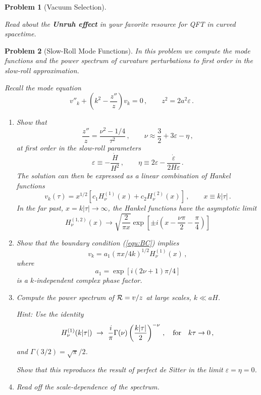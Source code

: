 \documentclass[12pt,letterpaper,rotate]{article}
\def\beq{\begin{equation}}
\def\eeq{\end{equation}}
\def\R{{\cal R}}
\newtheorem{thmP}{Problem}
\begin{document}
{\vskip 10pt
\begin{thmP}[Vacuum Selection]\label{ex:vacuum}

Read about the {\bf Unruh effect} in your favorite resource for QFT in curved spacetime.
 \end{thmP}
 
 
\begin{thmP}[Slow-Roll Mode Functions]\label{ex:SRmode}
In this problem we compute the mode functions and the power spectrum of curvature perturbations to first order in the slow-roll approximation.

\vskip 6pt
Recall the mode equation
\beq
v''_k + \left(k^2 - \frac{z''}{z} \right) v_k = 0\, , \qquad z^2 = 2 a^2 \varepsilon\, .
\eeq

\begin{enumerate}
\item Show that
\beq
\frac{z''}{z} = \frac{ \nu^2 - 1/4}{\tau^2}\, , \qquad \nu \approx \frac{3}{2} + 3 \varepsilon - \eta\, , 
\eeq
 at first order in the slow-roll parameters
 \beq
\varepsilon \equiv - \frac{\dot H}{H^2}\, , \qquad \eta \equiv 2\varepsilon - \frac{\dot \varepsilon}{2 H \varepsilon}\, .
\eeq
The solution can then be expressed as a linear combination of Hankel functions
\beq
v_k(\tau) = x^{1/2} \left[ c_1 H^{(1)}_\nu(x) + c_2 H^{(2)}_\nu(x)\right]\, , \qquad x \equiv k |\tau|\, .
\eeq
In the far past, $x = k|\tau| \to \infty$, the Hankel functions have the asymptotic limit
\beq
H_\nu^{(1,2)}(x) \to \sqrt{\frac{2}{\pi x}} \exp \left[ \pm i \left( x - \frac{\nu \pi}{2} - \frac{\pi}{4}\right)\right]
\eeq
\item Show that the boundary condition (\ref{equ:BC}) implies
\beq
v_k = a_1 (\pi x/4k)^{1/2} H_\nu^{(1)}(x)\, ,
\eeq
where
\beq
a_1 = \exp [i(2\nu + 1)\pi/4]
\eeq
is a $k$-independent complex phase factor.

\item Compute the power spectrum of $\R = v/ z$ at large scales, $k \ll aH$.

Hint: Use the identity
\beq
H^{(1)}_\nu(k |\tau|) \ \to\  \frac{i}{\pi} \Gamma(\nu) \left( \frac{k |\tau|}{2}\right)^{-\nu}\, , \quad {\rm for} \quad k \tau \to 0\, ,
\eeq
and $\Gamma(3/2) = \sqrt{\pi}/2$.

Show that this reproduces the result of perfect de Sitter in the limit $\varepsilon = \eta =0$.
\item Read off the scale-dependence of the spectrum.
\end{enumerate}

 \end{thmP}

}
\end{document}
